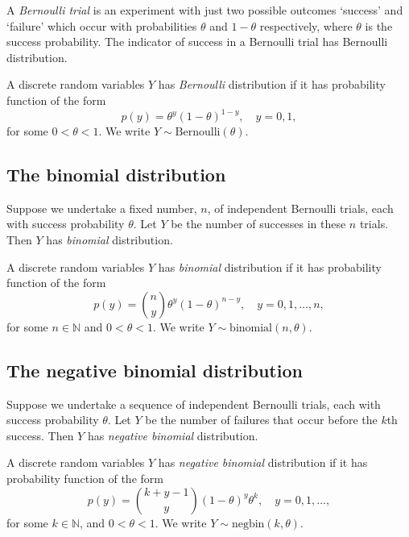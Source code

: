 \documentclass[]{book}
\theoremstyle{definition}
\theoremstyle{definition}
\theoremstyle{definition}
\theoremstyle{remark}
\let\BeginKnitrBlock\begin \let\EndKnitrBlock\end
\begin{document}
A \emph{Bernoulli trial} is an experiment with just two possible
outcomes `success' and `failure' which occur with probabilities
\(\theta\) and \(1- \theta\) respectively, where \(\theta\) is the
success probability. The indicator of success in a Bernoulli trial has
Bernoulli distribution.

\BeginKnitrBlock{definition}
\protect\hypertarget{def:unnamed-chunk-1}{}{\label{def:unnamed-chunk-1} }A
discrete random variables \(Y\) has \emph{Bernoulli} distribution if it
has probability function of the form
\[p(y) = \theta^y (1- \theta)^{1-y}, \quad y = 0, 1,\] for some
\(0 < \theta < 1\). We write \(Y \sim \text{Bernoulli}(\theta)\).
\EndKnitrBlock{definition}

\subsection{The binomial distribution}\label{the-binomial-distribution}

Suppose we undertake a fixed number, \(n\), of independent Bernoulli
trials, each with success probability \(\theta\). Let \(Y\) be the
number of successes in these \(n\) trials. Then \(Y\) has
\emph{binomial} distribution.

\BeginKnitrBlock{definition}
\protect\hypertarget{def:unnamed-chunk-2}{}{\label{def:unnamed-chunk-2} }A
discrete random variables \(Y\) has \emph{binomial} distribution if it
has probability function of the form
\[p(y) = \binom{n}{y} \theta^y (1 - \theta)^{n-y}, \quad y = 0, 1, \ldots, n,\]
for some \(n \in \mathbb{N}\) and \(0 < \theta < 1\). We write
\(Y \sim \text{binomial}(n, \theta)\).
\EndKnitrBlock{definition}

\subsection{The negative binomial
distribution}\label{the-negative-binomial-distribution}

Suppose we undertake a sequence of independent Bernoulli trials, each
with success probability \(\theta\). Let \(Y\) be the number of failures
that occur before the \(k\)th success. Then \(Y\) has \emph{negative
binomial} distribution. \BeginKnitrBlock{definition}

\protect\hypertarget{def:unnamed-chunk-3}{}{\label{def:unnamed-chunk-3} }A
discrete random variables \(Y\) has \emph{negative binomial}
distribution if it has probability function of the form
\[p(y) = \binom{k + y - 1}{y} (1 - \theta)^y \theta^k, \quad
  y = 0, 1, \ldots,
\] for some \(k \in \mathbb{N}\), and \(0 < \theta < 1\). We write
\(Y \sim \text{negbin}(k, \theta)\).
\EndKnitrBlock{definition}
\end{document}
